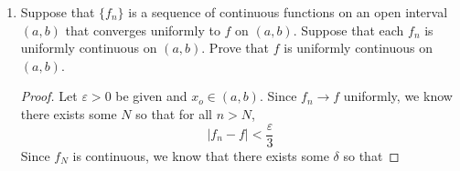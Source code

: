 \documentclass{article}
\begin{document}
\begin{enumerate}
\begin{proof}
\[                  \]
                  We know that, because $g$ is a continuous function,
                  $\int_a^b\lvert g(x)\rvert dx$ exists for all $a,b\in \mathbb{R}$. Thus,
                  \begin{align*}
                        \left\lvert\int_a^b(f_n(x)g(x))dx-\int_a^b(f(x)g(x))dx\right\rvert & = \left\lvert\int_a^b(f_n(x)g(x)-f(x)g(x))dx\right\rvert                       \\
                                                                                           & \leq \int_a^b\lvert f_n(x)g(x)-f(x)g(x)\rvert dx                               \\
                                                                                           & = \int_a^b\lvert g(x)\rvert\lvert f_n(x)-f(x)\rvert dx                         \\
                                                                                           & < \int_a^b\lvert g(x)\rvert\frac{\varepsilon}{\int_a^b\lvert g(x)\rvert dx} dx \\
                                                                                           & = \frac{\varepsilon}{\int_a^b\lvert g(x)\rvert dx}\int_a^b\lvert g(x)\rvert dx \\
                                                                                           & =\varepsilon
                  \end{align*}
                  Therefore, $\int_a^bf_n(t)g(t)dt\to \int_a^bf(t)g(t)dt$.
            \end{proof}
            \setcounter{enumi}{6}
      \item Suppose that $\{f_n\}$ is a sequence of continuous functions on an
            open interval $(a,b)$ that converges uniformly to $f$ on $(a,b)$.
            Suppose that each $f_n$ is uniformly continuous on $(a,b)$. Prove
            that $f$ is uniformly continuous on $(a,b)$.
            \begin{proof}
                  Let $\varepsilon>0$ be given and $x_o\in(a,b)$. Since $f_n\to f$ uniformly, we
                  know there exists some $N$ so that for all $n>N$,
                  \begin{equation}
                        \lvert f_n-f\rvert < \frac{\varepsilon}{3}
                        \label{eq:5.2_7_uniformConvergence}
                  \end{equation}
                  Since $f_N$ is continuous, we know that there exists some
                  $\delta$ so that

\end{proof}
\end{enumerate}
\end{document}
